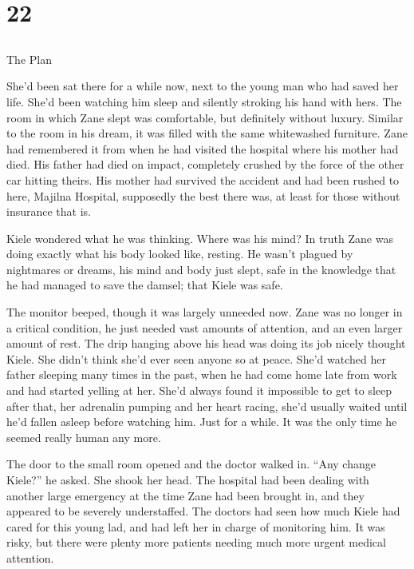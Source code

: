 \chapter{22}
\section{}
The Plan  

She'd been sat there for a while now, next to the young man who had saved her life.  She'd been watching him sleep and silently stroking his hand with hers.  The room in which Zane slept was comfortable, but definitely without luxury.  Similar to the room in his dream, it was filled with the same whitewashed furniture.  Zane had remembered it from when he had visited the hospital where his mother had died.  His father had died on impact, completely crushed by the force of the other car hitting theirs.  His mother had survived the accident and had been rushed to here, Majilna Hospital, supposedly the best there was, at least for those without insurance that is.  

  Kiele wondered what he was thinking.  Where was his mind?  In truth Zane was doing exactly what his body looked like, resting.  He wasn't plagued by nightmares or dreams, his mind and body just slept, safe in the knowledge that he had managed to save the damsel; that Kiele was safe.  

The monitor beeped, though it was largely unneeded now.  Zane was no longer in a critical condition, he just needed vast amounts of attention, and an even larger amount of rest.  The drip hanging above his head was doing its job nicely thought Kiele.  She didn't think she'd ever seen anyone so at peace.  She'd watched her father sleeping many times in the past, when he had come home late from work and had started yelling at her.  She'd always found it impossible to get to sleep after that, her adrenalin pumping and her heart racing, she'd usually waited until he'd fallen asleep before watching him.  Just for a while.  It was the only time he seemed really human any more.

The door to the small room opened and the doctor walked in.  ``Any change Kiele?'' he asked.  She shook her head.  The hospital had been dealing with another large emergency at the time Zane had been brought in, and they appeared to be severely understaffed.  The doctors had seen how much Kiele had cared for this young lad, and had left her in charge of monitoring him.  It was risky, but there were plenty more patients needing much more urgent medical attention.  

